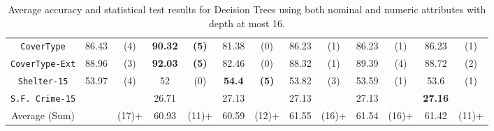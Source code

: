 \begin{table}
\begin{tabular}{c|cc|cc|cc|cc|cc|cc}
{\tt CoverType}      &  86.43         &  (4)              &  {\bf 90.32}&  {\bf (5)}    &  81.38       &  (0)               &  86.23      & (1)            & 86.23        & (1)       & 86.23        & (1)       \\
{\tt CoverType-Ext}  &  88.96         &  (3)              &  {\bf 92.03}&  {\bf (5)}    &  82.46       &  (0)               &  88.32      & (1)            & 89.39        & (4)       & 88.72        & (2)       \\
{\tt Shelter-15}     &  53.97         &  (4)              &  52         &  (0)          &  {\bf 54.4}  &  {\bf (5)}         &  53.82      & (3)            & 53.59        & (1)       & 53.6         & (1)       \\   
{\tt S.F. Crime-15}  &                &                   &  26.71      &               &  27.13       &                    &  27.13      &                & 27.13        &           & {\bf 27.16}  &           \\
\hline
Average (Sum)        &                &  (17)+            & 60.93       &  (11)+        &   60.59      &  (12)+             &  61.55      & (16)+          & 61.54        & (16)+     & 61.42        & (11)+

\end{tabular}
\caption{Average accuracy and statistical test results for  Decision Trees using both nominal and numeric attributes with depth at most 16.}
\label{exp:numeric-16}
\normalsize
\end{table}

